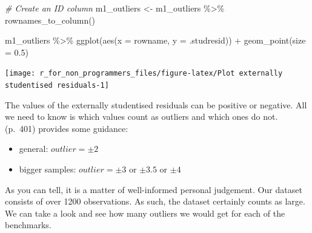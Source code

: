 \documentclass[
]{book}
\newenvironment{Shaded}{\begin{snugshade}}{\end{snugshade}}
\newcommand{\AttributeTok}[1]{\textcolor[rgb]{0.77,0.63,0.00}{#1}}
\newcommand{\CommentTok}[1]{\textcolor[rgb]{0.56,0.35,0.01}{\textit{#1}}}
\newcommand{\FloatTok}[1]{\textcolor[rgb]{0.00,0.00,0.81}{#1}}
\newcommand{\FunctionTok}[1]{\textcolor[rgb]{0.00,0.00,0.00}{#1}}
\newcommand{\NormalTok}[1]{#1}
\newcommand{\OtherTok}[1]{\textcolor[rgb]{0.56,0.35,0.01}{#1}}
\newcommand{\SpecialCharTok}[1]{\textcolor[rgb]{0.00,0.00,0.00}{#1}}
\begin{document}
\begin{Shaded}
\begin{Highlighting}[]
\CommentTok{\# Create an ID column}
\NormalTok{m1\_outliers }\OtherTok{\textless{}{-}}\NormalTok{ m1\_outliers }\SpecialCharTok{\%\textgreater{}\%} \FunctionTok{rownames\_to\_column}\NormalTok{()}

\NormalTok{m1\_outliers }\SpecialCharTok{\%\textgreater{}\%}
  \FunctionTok{ggplot}\NormalTok{(}\FunctionTok{aes}\NormalTok{(}\AttributeTok{x =}\NormalTok{ rowname,}
             \AttributeTok{y =}\NormalTok{ .studresid)) }\SpecialCharTok{+}
  \FunctionTok{geom\_point}\NormalTok{(}\AttributeTok{size =} \FloatTok{0.5}\NormalTok{)}
\end{Highlighting}
\end{Shaded}

\begin{center}\texttt{[image: r\_for\_non\_programmers\_files/figure-latex/Plot externally studentised residuals-1]} \end{center}

The values of the externally studentised residuals can be positive or negative. All we need to know is which values count as outliers and which ones do not. \citet{cohen2014applied} (p.~401) provides some guidance:

\begin{itemize}
\item
  general: \(outlier = \pm 2\)
\item
  bigger samples: \(outlier = \pm 3\) or \(\pm 3.5\) or \(\pm 4\)
\end{itemize}

As you can tell, it is a matter of well-informed personal judgement. Our dataset consists of over 1200 observations. As such, the dataset certainly counts as large. We can take a look and see how many outliers we would get for each of the benchmarks.
\end{document}
